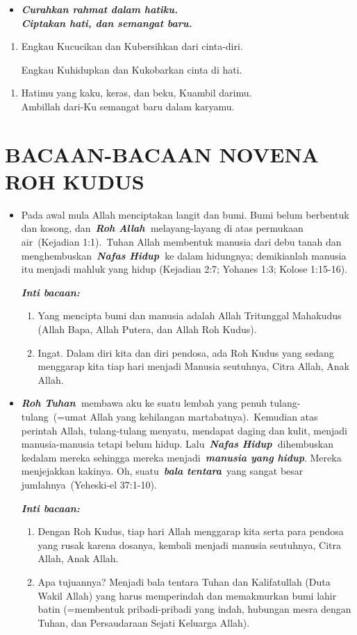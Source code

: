 \documentclass{scrartcl}
\newcommand{\roleSay}[2]{\begin{itemize} \item[#1:] #2 \end{itemize}}
\newcounter{urut}
\newcommand{\bait}[1]{%
  \begin{enumerate}
  \slshape
  \setcounter{enumi}{\value{urut}}
  \item #1
  \setcounter{urut}{\value{enumi}}
  \end{enumerate}	
}
\begin{document}
\roleSay{\textit{Refr.}}{\textit{\textbf{Curahkan rahmat dalam hatiku.\\ Ciptakan hati, dan semangat baru.}}}

\bait{Engkau Kucucikan dan Kubersihkan dari cinta-diri.\par Engkau Kuhidupkan dan Kukobarkan cinta di hati.}

\bait{Hatimu yang kaku, keras, dan beku, Kuambil darimu.\\
Ambillah dari-Ku semangat baru dalam karyamu.} 


\section*{BACAAN-BACAAN NOVENA ROH KUDUS}
\label{bacaanLain}
\newcommand{\hari}[2]{\roleSay{Hari-#1}{#2}}

\hari{1}{Pada awal mula Allah menciptakan langit dan bumi. Bumi belum
berbentuk dan kosong, dan~\textbf{\emph{Roh Allah~}}melayang-layang di
atas permukaan air~(Kejadian 1:1).~Tuhan Allah membentuk manusia dari
debu tanah dan menghembuskan~\textbf{\emph{Nafas Hidup~}}ke dalam
hidungnya; demikianlah manusia itu menjadi mahluk yang hidup (Kejadian
2:7; Yohanes 1:3; Kolose 1:15-16).

\textit{\textbf{Inti bacaan:}}
\begin{enumerate}
\item Yang mencipta bumi dan manusia
adalah Allah Tritunggal Mahakudus (Allah Bapa, Allah Putera, dan Allah
Roh Kudus). 
\item Ingat. Dalam diri kita dan diri pendosa, ada Roh Kudus
yang sedang menggarap kita tiap hari menjadi Manusia seutuhnya, Citra
Allah, Anak Allah.
\end{enumerate}
}

\hari{2}{\textbf{\emph{Roh Tuhan~}}membawa aku ke suatu lembah yang
penuh tulang-tulang~(=umat Allah yang kehilangan martabatnya).~Kemudian
atas perintah Allah, tulang-tulang menyatu, mendapat daging dan kulit,
menjadi manusia-manusia tetapi belum hidup. Lalu~\textbf{\emph{Nafas
Hidup~}}dihembuskan kedalam mereka sehingga mereka
menjadi~\textbf{\emph{manusia yang hidup}}. Mereka menjejakkan kakinya.
Oh, suatu~\textbf{\emph{bala tentara}}~yang sangat besar
jumlahnya~(Yeheski-el 37:1-10). 

\textit{\textbf{Inti bacaan:}}
\begin{enumerate}
\item Dengan Roh Kudus, tiap hari Allah
menggarap kita serta para pendosa yang rusak karena dosanya, kembali
menjadi manusia seutuhnya, Citra Allah, Anak Allah. \item Apa tujuannya?
Menjadi bala tentara Tuhan dan Kalifatullah (Duta Wakil Allah) yang
harus memperindah dan memakmurkan bumi lahir batin (=membentuk
pribadi-pribadi yang indah, hubungan mesra dengan Tuhan, dan
Persaudaraan Sejati Keluarga Allah).
\end{enumerate}
}
\end{document}
